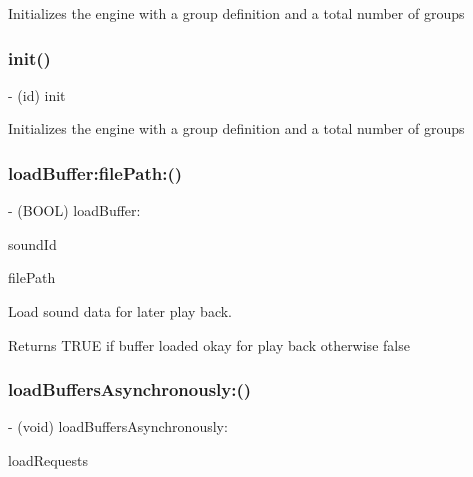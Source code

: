 Initializes the engine with a group definition and a total number of groups \mbox{\label{interfaceCDSoundEngine_a013cb9b6cf86c0dbfca8fac6aae0bd6a}} 
\subsubsection{\texorpdfstring{init()}{init()}\hspace{0.1cm}{\footnotesize\ttfamily [4/4]}}
{\footnotesize\ttfamily -\/ (id) init \begin{DoxyParamCaption}{ }\end{DoxyParamCaption}}

Initializes the engine with a group definition and a total number of groups \mbox{\label{interfaceCDSoundEngine_a6b28868545d700c3cc40d087527c6012}} 
\subsubsection{\texorpdfstring{load\+Buffer\+:file\+Path\+:()}{loadBuffer:filePath:()}}
{\footnotesize\ttfamily -\/ (B\+O\+OL) load\+Buffer\+: \begin{DoxyParamCaption}\item[{(int)}]{sound\+Id }\item[{filePath:(N\+S\+String$\ast$)}]{file\+Path }\end{DoxyParamCaption}}

Load sound data for later play back. \begin{DoxyReturn}{Returns}
T\+R\+UE if buffer loaded okay for play back otherwise false 
\end{DoxyReturn}
\mbox{\label{interfaceCDSoundEngine_a8ab83905d8865c75c8055871f5c84fdd}} 
\subsubsection{\texorpdfstring{load\+Buffers\+Asynchronously\+:()}{loadBuffersAsynchronously:()}}
{\footnotesize\ttfamily -\/ (void) load\+Buffers\+Asynchronously\+: \begin{DoxyParamCaption}\item[{(N\+S\+Array $\ast$)}]{load\+Requests }\end{DoxyParamCaption}}

